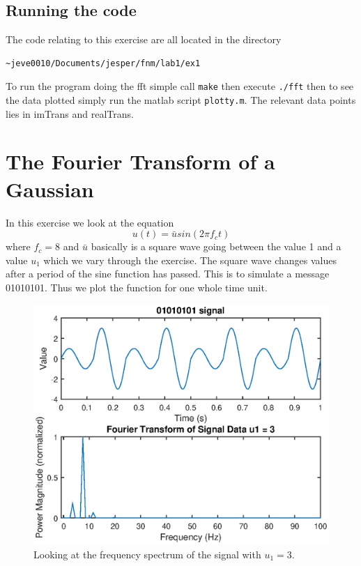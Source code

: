 \documentclass[11pt]{article}
\begin{document}
\subsection{Running the code}
The code relating to this exercise are all located in the directory
\begin{verbatim}
~jeve0010/Documents/jesper/fnm/lab1/ex1
\end{verbatim}
To run the program doing the fft simple call \verb+make+ then execute \verb+./fft+ then to see the data plotted simply run the matlab script \verb+plotty.m+.  The relevant data points lies in imTrans and realTrans.

\section{The Fourier Transform of a Gaussian}
In this exercise we look at the equation 
\begin{equation}
	u(t) = \bar{u} sin(2 \pi f_c t )
\end{equation}
where $f_c = 8$ and $\bar{u}$ basically is a square wave going between the value 1 and a value $u_1$ which we vary through the exercise. The square wave changes values after a period of the sine function has passed. This is to simulate a message 01010101. Thus we plot the function for one whole time unit. 
\begin{figure}[H]
	\centering
	\includegraphics[width=1\textwidth]{../ex2/fftU1-3}
	\caption{Looking at the frequency spectrum of the signal with $u_1 = 3$.}
	\label{fig:fftU1-3}
\end{figure}
\end{document}

